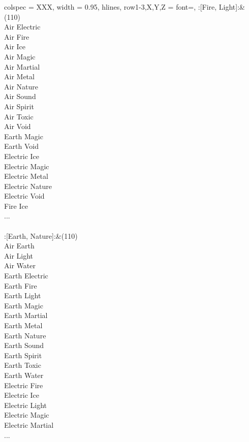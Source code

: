 \begin{longtblr}[
	caption = {2v2 Attacking Effective},
	label = {2v2-Attacking-Effective},
]{
	colspec = {XXX}, width = 0.95\linewidth,
	hlines,
	row{1-3,X,Y,Z} = {font=\bfseries},
}
	:[Fire, Light]:&{(110)\\
	Air Electric \\
	Air Fire \\
	Air Ice \\
	Air Magic \\
	Air Martial \\
	Air Metal \\
	Air Nature \\
	Air Sound \\
	Air Spirit \\
	Air Toxic \\
	Air Void \\
	Earth Magic \\
	Earth Void \\
	Electric Ice \\
	Electric Magic \\
	Electric Metal \\
	Electric Nature \\
	Electric Void \\
	Fire Ice \\
	...\\
	}\\

	:[Earth, Nature]:&{(110)\\
	Air Earth \\
	Air Light \\
	Air Water \\
	Earth Electric \\
	Earth Fire \\
	Earth Light \\
	Earth Magic \\
	Earth Martial \\
	Earth Metal \\
	Earth Nature \\
	Earth Sound \\
	Earth Spirit \\
	Earth Toxic \\
	Earth Water \\
	Electric Fire \\
	Electric Ice \\
	Electric Light \\
	Electric Magic \\
	Electric Martial \\
	...\\
	}\\


\end{longtblr}
